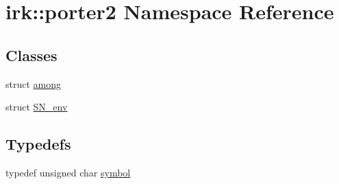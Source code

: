 \hypertarget{namespaceirk_1_1porter2}{}\section{irk\+:\+:porter2 Namespace Reference}
\label{namespaceirk_1_1porter2}
\subsection*{Classes}
\begin{DoxyCompactItemize}
\item 
struct \mbox{\hyperlink{structirk_1_1porter2_1_1among}{among}}
\item 
struct \mbox{\hyperlink{structirk_1_1porter2_1_1SN__env}{S\+N\+\_\+env}}
\end{DoxyCompactItemize}
\subsection*{Typedefs}
\begin{DoxyCompactItemize}
\item 
typedef unsigned char \mbox{\hyperlink{namespaceirk_1_1porter2_afd04c4eb58a1dabcf8f3ab2d7e9f9ed5}{symbol}}
\end{DoxyCompactItemize}
